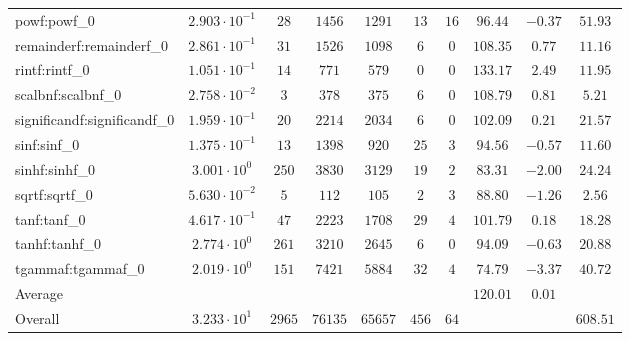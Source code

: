 \begin{tabular}{|l|c|c|c|c|c|c|c|c|c|}
powf:powf\_0                 & $ 2.903 \cdot 10^{-1} $ & $ 28     $ & $ 1456  $ & $ 1291  $ & $ 13  $ & $ 16 $ & $ 96.44       $ & $ -0.37   $ & $ 51.93   $ \\
remainderf:remainderf\_0     & $ 2.861 \cdot 10^{-1} $ & $ 31     $ & $ 1526  $ & $ 1098  $ & $ 6   $ & $ 0  $ & $ 108.35      $ & $ 0.77    $ & $ 11.16   $ \\
rintf:rintf\_0               & $ 1.051 \cdot 10^{-1} $ & $ 14     $ & $ 771   $ & $ 579   $ & $ 0   $ & $ 0  $ & $ 133.17      $ & $ 2.49    $ & $ 11.95   $ \\
scalbnf:scalbnf\_0           & $ 2.758 \cdot 10^{-2} $ & $ 3      $ & $ 378   $ & $ 375   $ & $ 6   $ & $ 0  $ & $ 108.79      $ & $ 0.81    $ & $ 5.21    $ \\
significandf:significandf\_0 & $ 1.959 \cdot 10^{-1} $ & $ 20     $ & $ 2214  $ & $ 2034  $ & $ 6   $ & $ 0  $ & $ 102.09      $ & $ 0.21    $ & $ 21.57   $ \\
sinf:sinf\_0                 & $ 1.375 \cdot 10^{-1} $ & $ 13     $ & $ 1398  $ & $ 920   $ & $ 25  $ & $ 3  $ & $ 94.56       $ & $ -0.57   $ & $ 11.60   $ \\
sinhf:sinhf\_0               & $ 3.001 \cdot 10^{0}  $ & $ 250    $ & $ 3830  $ & $ 3129  $ & $ 19  $ & $ 2  $ & $ 83.31       $ & $ -2.00   $ & $ 24.24   $ \\
sqrtf:sqrtf\_0               & $ 5.630 \cdot 10^{-2} $ & $ 5      $ & $ 112   $ & $ 105   $ & $ 2   $ & $ 3  $ & $ 88.80       $ & $ -1.26   $ & $ 2.56    $ \\
tanf:tanf\_0                 & $ 4.617 \cdot 10^{-1} $ & $ 47     $ & $ 2223  $ & $ 1708  $ & $ 29  $ & $ 4  $ & $ 101.79      $ & $ 0.18    $ & $ 18.28   $ \\
tanhf:tanhf\_0               & $ 2.774 \cdot 10^{0}  $ & $ 261    $ & $ 3210  $ & $ 2645  $ & $ 6   $ & $ 0  $ & $ 94.09       $ & $ -0.63   $ & $ 20.88   $ \\
tgammaf:tgammaf\_0           & $ 2.019 \cdot 10^{0}  $ & $ 151    $ & $ 7421  $ & $ 5884  $ & $ 32  $ & $ 4  $ & $ 74.79       $ & $ -3.37   $ & $ 40.72   $ \\
\hline
Average                      & $                     $ & $        $ & $       $ & $       $ & $     $ & $    $ & $ 120.01      $ & $ 0.01    $ & $         $ \\
\hline
Overall                      & $ 3.233 \cdot 10^{1}  $ & $ 2965   $ & $ 76135 $ & $ 65657 $ & $ 456 $ & $ 64 $ & $             $ & $         $ & $ 608.51  $ \\
\hline
\end{tabular}
